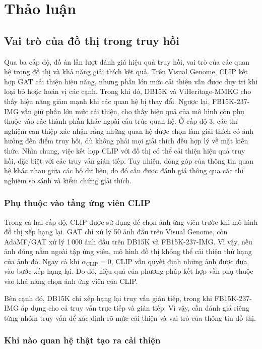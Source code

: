 \chapter{Thảo luận}
\label{chap:discussion}

\section{Vai trò của đồ thị trong truy hồi}
\label{sec:cross-level-findings}

Qua ba cấp độ, đồ án lần lượt đánh giá hiệu quả truy hồi, vai trò của các quan hệ trong đồ thị và khả năng giải thích kết quả. Trên Visual Genome, CLIP kết hợp GAT cải thiện hiệu năng, nhưng phần lớn mức cải thiện vẫn được duy trì khi loại bỏ hoặc hoán vị các cạnh. Trong khi đó, DB15K và ViHeritage-MMKG cho thấy hiệu năng giảm mạnh khi các quan hệ bị thay đổi. Ngược lại, FB15K-237-IMG vẫn giữ phần lớn mức cải thiện, cho thấy hiệu quả của mô hình còn phụ thuộc vào các thành phần khác ngoài cấu trúc quan hệ. Ở cấp độ 3, các thí nghiệm can thiệp xác nhận rằng những quan hệ được chọn làm giải thích có ảnh hưởng đến điểm truy hồi, dù không phải mọi giải thích đều hợp lý về mặt kiến thức. Nhìn chung, việc kết hợp CLIP với đồ thị có thể cải thiện hiệu quả truy hồi, đặc biệt với các truy vấn gián tiếp. Tuy nhiên, đóng góp của thông tin quan hệ khác nhau giữa các bộ dữ liệu, do đó cần được đánh giá thông qua các thí nghiệm so sánh và kiểm chứng giải thích.

\subsection{Phụ thuộc vào tầng ứng viên CLIP}

Trong cả hai cấp độ, CLIP được sử dụng để chọn ảnh ứng viên trước khi mô hình đồ thị xếp hạng lại. GAT chỉ xử lý 50 ảnh đầu trên Visual Genome, còn AdaMF/GAT xử lý 1\,000 ảnh đầu trên DB15K và FB15K-237-IMG. Vì vậy, nếu ảnh đúng nằm ngoài tập ứng viên, mô hình đồ thị không thể cải thiện thứ hạng của ảnh đó. Ngay cả khi $\alpha_{\mathrm{CLIP}}=0$, CLIP vẫn quyết định những ảnh được đưa vào bước xếp hạng lại. Do đó, hiệu quả của phương pháp kết hợp vẫn phụ thuộc vào khả năng chọn ảnh ứng viên của CLIP.

Bên cạnh đó, DB15K chỉ xếp hạng lại truy vấn gián tiếp, trong khi FB15K-237-IMG áp dụng cho cả truy vấn trực tiếp và gián tiếp. Vì vậy, cần đánh giá riêng từng nhóm truy vấn để xác định rõ mức cải thiện và vai trò của thông tin đồ thị.

\subsection{Khi nào quan hệ thật tạo ra cải thiện}

